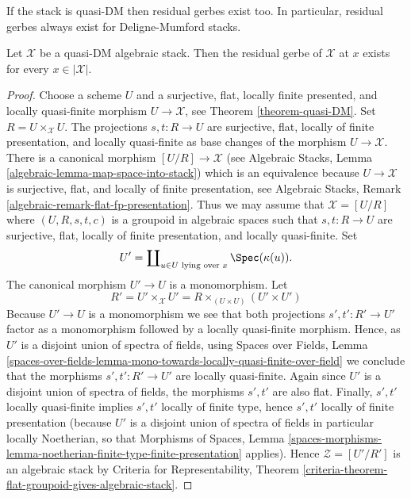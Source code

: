\noindent
If the stack is quasi-DM then residual gerbes exist too.
In particular, residual gerbes always exist for Deligne-Mumford stacks.

\begin{lemma}
\label{lemma-every-point-residual-gerbe-quasi-DM}
Let $\mathcal{X}$ be a quasi-DM algebraic stack.
Then the residual gerbe of $\mathcal{X}$ at $x$ exists for
every $x \in |\mathcal{X}|$.
\end{lemma}

\begin{proof}
Choose a scheme $U$ and a surjective, flat, locally finite presented,
and locally quasi-finite morphism $U \to \mathcal{X}$, see
Theorem \ref{theorem-quasi-DM}.
Set $R = U \times_\mathcal{X} U$. The projections $s, t : R \to U$
are surjective, flat, locally of finite presentation, and
locally quasi-finite as base changes of the morphism $U \to \mathcal{X}$.
There is a canonical morphism $[U/R] \to \mathcal{X}$ (see
Algebraic Stacks, Lemma \ref{algebraic-lemma-map-space-into-stack})
which is an equivalence because $U \to \mathcal{X}$ is surjective, flat,
and locally of finite presentation, see
Algebraic Stacks, Remark \ref{algebraic-remark-flat-fp-presentation}.
Thus we may assume that $\mathcal{X} = [U/R]$ where
$(U, R, s, t, c)$ is a groupoid in algebraic spaces such that
$s, t : R \to U$ are surjective, flat, locally of finite presentation,
and locally quasi-finite. Set
$$
U' = \coprod\nolimits_{u \in U\text{ lying over }x} \Spec(\kappa(u)).
$$
The canonical morphism $U' \to U$ is a monomorphism. Let
$$
R' = U' \times_\mathcal{X} U' =
R \times_{(U \times U)} (U' \times U')
$$
Because $U' \to U$ is a monomorphism we see that both projections
$s', t' : R' \to U'$ factor as a monomorphism followed by a locally
quasi-finite morphism. Hence, as $U'$ is a disjoint union of spectra
of fields, using
Spaces over Fields, Lemma
\ref{spaces-over-fields-lemma-mono-towards-locally-quasi-finite-over-field}
we conclude that the morphisms $s', t' : R' \to U'$ are locally quasi-finite.
Again since $U'$ is a disjoint union of spectra of fields, the morphisms
$s', t'$ are also flat. Finally, $s', t'$ locally quasi-finite
implies $s', t'$ locally of finite type, hence $s', t'$ locally of finite
presentation (because $U'$ is a disjoint union of spectra of fields
in particular locally Noetherian, so that
Morphisms of Spaces, Lemma
\ref{spaces-morphisms-lemma-noetherian-finite-type-finite-presentation}
applies). Hence $\mathcal{Z} = [U'/R']$ is an algebraic stack by
Criteria for Representability, Theorem
\ref{criteria-theorem-flat-groupoid-gives-algebraic-stack}.

\end{proof}
